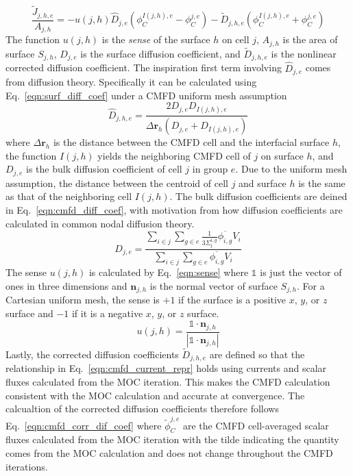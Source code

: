 \begin{equation}
	\frac{\tilde{J}_{j,h,e}}{A_{j,h}} = - u(j,h) \hat{D}_{j,e} \left(\phi_C^{I(j,h),e} - \phi_C^{j,e}\right) - \tilde{D}_{j,h,e} \left(\phi_C^{I(j,h),e} + \phi_C^{j,e}\right)
	\label{eqn:cmfd_current_repr}
\end{equation}
The function $u(j,h)$ is the \textit{sense} of the surface $h$ on cell $j$, $A_{j,h}$ is the area of surface $S_{j,h}$, $\hat{D}_{j,e}$ is the surface diffusion coefficient, and $\tilde{D}_{j,h,e}$ is the nonlinear corrected diffusion coefficient. The inspiration first term involving $\hat{D}_{j,e}$ comes from diffusion theory. Specifically it can be calculated using Eq.~\ref{eqn:surf_diff_coef} under a CMFD uniform mesh assumption
\begin{equation}
	\hat{D}_{j,h,e} = \frac{2 D_{j,e} D_{I(j,h),e}}{\Delta \mathbf{r}_h \left( D_{j,e} + D_{I(j,h),e} \right)}
\end{equation}
where $\Delta \mathbf{r}_h$ is the distance between the CMFD cell and the interfacial surface $h$, the function $I(j,h)$ yields the neighboring CMFD cell of $j$ on surface $h$, and $D_{j,e}$ is the bulk diffusion coefficient of cell $j$ in group $e$. Due to the uniform mesh assumption, the distance between the centroid of cell $j$ and surface $h$ is the same as that of the neighboring cell $I(j,h)$. The bulk diffusion coefficients are deined in Eq.~\ref{eqn:cmfd_diff_coef}, with motivation from how diffusion coefficients are calculated in common nodal diffusion theory.
\begin{equation}
	D_{j,e} = \frac{\sum_{i \in j} \sum_{g \in e} \frac{1}{3\Sigma_{t}^{i, g}} \overline{\phi_{i,g}} V_i}{\sum_{i \in j} \sum_{g \in e} \overline{\phi_{i,g}} V_i}
	\label{eqn:cmfd_diff_coef}
\end{equation}
The sense $u(j,h)$ is calculated by Eq.~\ref{eqn:sense} where $\mathbb{1}$ is just the vector of ones in three dimensions and $\mathbf{n}_{j,h}$ is the normal vector of surface $S_{j,h}$. For a Cartesian uniform mesh, the sense is $+1$ if the surface is a positive $x$, $y$, or $z$ surface and $-1$ if it is a negative $x$, $y$, or $z$ surface.
\begin{equation}
u(j,h) = \frac{\mathbb{1} \cdot \mathbf{n}_{j,h}}{|\mathbb{1} \cdot \mathbf{n}_{j,h}|}
\label{eqn:sense}
\end{equation}
Lastly, the corrected diffusion coefficients $\tilde{D}_{j,h,e}$ are defined so that the relationship in Eq.~\ref{eqn:cmfd_current_repr} holds using currents and scalar fluxes calculated from the MOC iteration. This makes the CMFD calculation consistent with the MOC calculation and accurate at convergence. The calcualtion of the corrected diffusion coefficients therefore follows Eq.~\ref{eqn:cmfd_corr_dif_coef} where $\tilde{\phi}_C^{j,e}$ are the CMFD cell-averaged scalar fluxes calculated from the MOC iteration with the tilde indicating the quantity comes from the MOC calculation and does not change throughout the CMFD iterations.
